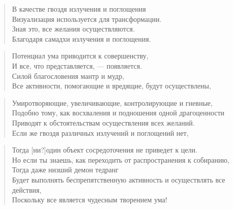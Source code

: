 \begin{verse}
В качестве гвоздя излучения и поглощения\\
Визуализация используется для трансформации.\\
Зная это, все желания осуществляются.\\
Благодаря самадхи излучения и поглощения.
\end{verse}

\begin{verse}
Потенциал ума приводится к совершенству,\\
И все, что представляется, — появляется.\\
Силой благословения мантр и мудр,\\
Все активности, помогающие и вредящие, будут осуществлены,
\end{verse}

\begin{verse}
Умиротворяющие, увеличивающие, контролирующие и гневные,\\
Подобно тому, как восхваления и подношения одной драгоценности\\
Приводят к обстоятельствам осуществления всех желаний.\\
Если же гвоздя различных излучений и поглощений нет,
\end{verse}

\begin{verse}
Тогда [ни?]один объект сосредоточения не приведет к цели.\\
Но если ты знаешь, как переходить от распространения к собиранию,\\
Тогда даже низший демон тедранг\\
Будет выполнять беспрепятственную активность и осуществлять все действия,\\
Поскольку все является чудесным творением ума!
\end{verse}

